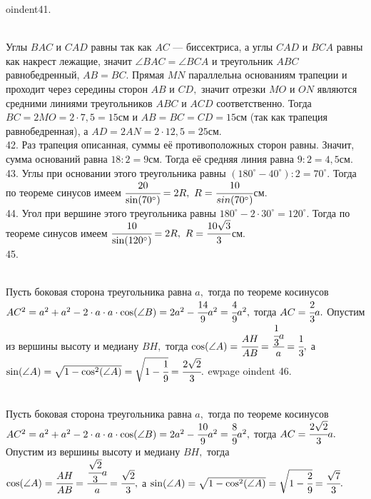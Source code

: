 oindent41. \begin{figure}[ht!]
\end{figure}\\
Углы $BAC$ и $CAD$ равны так как $AC$ --- биссектриса, а углы $CAD$ и $BCA$ равны как накрест лежащие, значит $\angle BAC=\angle BCA$ и треугольник $ABC$ равнобедренный, $AB=BC.$ Прямая $MN$ параллельна основаниям трапеции и проходит через середины сторон $AB$ и $CD,$ значит отрезки $MO$ и $ON$ являются средними линиями треугольников $ABC$ и $ACD$ соответственно. Тогда $BC=2MO=2\cdot7,5=15$см и $AB=BC=CD=15$см (так как трапеция равнобедренная), а $AD=2AN=2\cdot12,5=25$см.\\
42. Раз трапеция описанная, суммы её противоположных сторон равны. Значит, сумма оснований равна $18:2=9$см. Тогда её средняя линия равна $9:2=4,5$см.\\
43. Углы при основании этого треугольника равны $(180^\circ-40^\circ):2=70^\circ.$ Тогда по теореме синусов имеем $\cfrac{20}{\sin(70^\circ)}=2R,\ R=\cfrac{10}{sin(70^\circ)}$см.\\
44. Угол при вершине этого треугольника равны $180^\circ-2\cdot30^\circ=120^\circ.$ Тогда по теореме синусов имеем $\cfrac{10}{\sin(120^\circ)}=2R,\ R=\cfrac{10\sqrt{3}}{3}$см.\\
45. \begin{figure}[ht!]
\end{figure}\\
Пусть боковая сторона треугольника равна $a,$ тогда по теореме косинусов $AC^2=a^2+a^2-2\cdot a\cdot a\cdot \cos(\angle B)=2a^2-\cfrac{14}{9}a^2=\cfrac{4}{9}a^2,$
тогда $AC=\cfrac{2}{3}a.$ Опустим из вершины высоту и медиану $BH,$ тогда $\cos(\angle A)=\cfrac{AH}{AB}=\cfrac{\cfrac{1}{3}a}{a}=\cfrac{1}{3},$
а $\sin(\angle A)=\sqrt{1-\cos^2(\angle A)}=\sqrt{1-\cfrac{1}{9}}=\cfrac{2\sqrt{2}}{3}.$
ewpage
oindent
46. \begin{figure}[ht!]
\end{figure}\\
Пусть боковая сторона треугольника равна $a,$ тогда по теореме косинусов $AC^2=a^2+a^2-2\cdot a\cdot a\cdot \cos(\angle B)=2a^2-\cfrac{10}{9}a^2=\cfrac{8}{9}a^2,$
тогда $AC=\cfrac{2\sqrt{2}}{3}a.$ Опустим из вершины высоту и медиану $BH,$ тогда $\cos(\angle A)=\cfrac{AH}{AB}=\cfrac{\cfrac{\sqrt{2}}{3}a}{a}=\cfrac{\sqrt{2}}{3},$
а $\sin(\angle A)=\sqrt{1-\cos^2(\angle A)}=\sqrt{1-\cfrac{2}{9}}=\cfrac{\sqrt{7}}{3}.$\\

